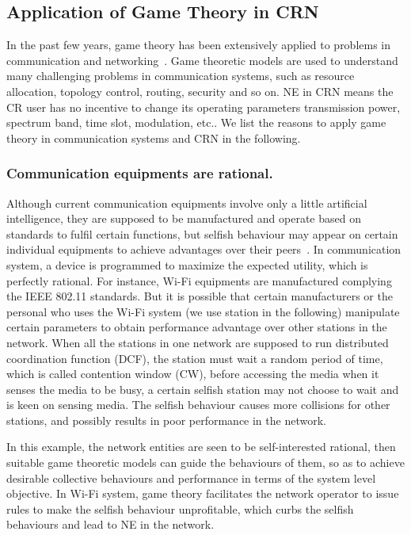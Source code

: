 \subsection{Application of Game Theory in CRN}

In the past few years, game theory has been extensively applied to problems in communication and networking~\cite{Neel06analysisand, Wang_gtc_crn_survey_2010}.
Game theoretic models are used to understand many challenging problems in communication systems, such as resource allocation, topology control, routing, security and so on. 
NE in CRN means the CR user has no incentive to change its operating parameters \eg transmission power, spectrum band, time slot, modulation, etc.. 
We list the reasons to apply game theory in communication systems and CRN in the following.

\subsubsection*{Communication equipments are rational.}
Although current communication equipments involve only a little artificial intelligence, they are supposed to be manufactured and operate based on standards to fulfil certain functions, but selfish behaviour may appear on certain individual equipments to achieve advantages over their peers~\cite{game_for_communication_01}.
In communication system, a device is programmed to maximize the expected utility, which is perfectly rational.
For instance, Wi-Fi equipments are manufactured complying the IEEE 802.11 standards.
But it is possible that certain manufacturers or the personal who uses the Wi-Fi system (we use station in the following) manipulate certain parameters to obtain performance advantage over other stations in the network.
When all the stations in one network are supposed to run distributed coordination function (\gls{DCF}), \ie the station must wait a random period of time, which is called contention window (\gls{CW}), before accessing the media when it senses the media to be busy, a certain selfish station may not choose to wait and is keen on sensing media.
The selfish behaviour causes more collisions for other stations, and possibly results in poor performance in the network.

In this example, the network entities are seen to be self-interested rational, then suitable game theoretic models can guide the behaviours of them, so as to achieve desirable collective behaviours and performance in terms of the system level objective.
In Wi-Fi system, game theory facilitates the network operator to issue rules to make the selfish behaviour unprofitable, which curbs the selfish behaviours and lead to NE in the network.

